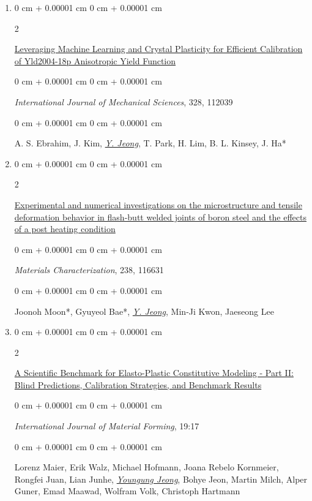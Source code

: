 \documentclass[10pt, letterpaper]{article}
\newenvironment{onecolentry}{
    \begin{adjustwidth}{
        0 cm + 0.00001 cm
    }{
        0 cm + 0.00001 cm
    }
}{
    \end{adjustwidth}
} %
\newenvironment{twocolentry}[2][]{
    \onecolentry
    \def\secondColumn{#2}
    \setcolumnwidth{\fill, 4.5 cm}
    \begin{paracol}{2}
}{
    \switchcolumn \raggedleft \secondColumn
    \end{paracol}
    \endonecolentry
} %
\begin{document}
\begin{enumerate}
        \item
          \begin{twocolentry}{2026}
            \href{https://doi.org/10.1016/j.ijmecsci.2026.112039}{Leveraging Machine Learning and Crystal Plasticity for Efficient Calibration of Yld2004-18p Anisotropic Yield Function}
          \end{twocolentry}
        \begin{onecolentry}
          {\it International Journal of Mechanical Sciences}, 328, 112039
        \end{onecolentry}
          \begin{onecolentry}
            A. S. Ebrahim,  J. Kim, {\underline{\textit{Y. Jeong}}}, T. Park, H. Lim, B. L. Kinsey, J. Ha*
          \end{onecolentry}
          \vspace{0.10 cm}


        \item
          \begin{twocolentry}{2026}
            \href{https://doi.org/10.1016/j.matchar.2026.116631}{Experimental and numerical investigations on the microstructure and tensile deformation behavior in flash-butt welded joints of boron steel and the effects of a post heating condition}
          \end{twocolentry}
        \begin{onecolentry}
          {\it Materials Characterization}, 238, 116631
        \end{onecolentry}
          \begin{onecolentry}
            Joonoh Moon*, Gyuyeol Bae*, {\underline{\textit{Y. Jeong}}}, Min-Ji Kwon, Jaeseong Lee
          \end{onecolentry}
          \vspace{0.10 cm}


        \item
          \begin{twocolentry}{2026}
            \href{https://doi.org/10.1007/s12289-026-01984-1}{A Scientific Benchmark for Elasto-Plastic Constitutive Modeling - Part II: Blind Predictions, Calibration Strategies, and Benchmark Results}
          \end{twocolentry}
        \begin{onecolentry}
            {\it International Journal of Material Forming}, 19:17
        \end{onecolentry}
          \begin{onecolentry}
            Lorenz Maier, Erik Walz, Michael Hofmann, Joana Rebelo Kornmeier, Rongfei Juan, Lian Junhe, {\underline{\textit{Youngung Jeong}}}, Bohye Jeon, Martin Milch, Alper Guner, Emad Maawad, Wolfram Volk, Christoph Hartmann
          \end{onecolentry}
          \vspace{0.10 cm}



\end{enumerate}
\end{document}

